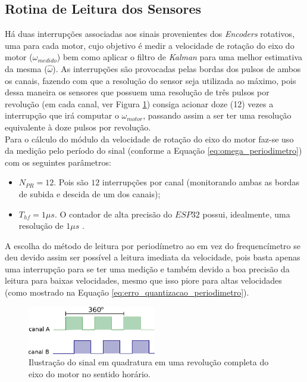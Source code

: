 \subsection{Rotina de Leitura dos Sensores}
\label{subsec:rotina_sensores}

Há duas interrupções associadas aos sinais provenientes dos \emph{Encoders} rotativos, uma para cada motor, cujo objetivo é medir a velocidade de rotação do eixo do motor ($\omega_{medido}$) bem como aplicar o filtro de \emph{Kalman} para uma melhor estimativa da mesma ($\hat{\omega}$). As interrupções são provocadas pelas bordas dos pulsos de ambos os canais, fazendo com que a resolução do sensor seja utilizada ao máximo, pois dessa maneira os sensores que possuem uma resolução de três pulsos por revolução (em cada canal, ver Figura \ref{fig:ilustracao_uma_revolucao}) consiga acionar doze (12) vezes a interrupção que irá computar o $\omega_{motor}$, passando assim a ser ter uma resolução equivalente à doze pulsos por revolução.\\

Para o cálculo do módulo da velocidade de rotação do eixo do motor faz-se uso da medição pelo período do sinal (conforme a Equação \ref{eq:omega_periodimetro}) com os seguintes parâmetros:

\begin{itemize}
    \item $N_{PR} = 12$. Pois são $12$ interrupções por canal (monitorando ambas as bordas de subida e descida de um dos canais);
    \item $T_{hf} = 1\mu{}s$. O contador de alta precisão do $ESP32$ possui, idealmente, uma resolução de $1\mu{}s$ \cite{esp}.
\end{itemize}

A escolha do método de leitura por periodímetro ao em vez do frequencímetro se deu devido assim ser possível a leitura imediata da velocidade, pois basta apenas uma interrupção para se ter uma medição e também devido a boa precisão da leitura para baixas velocidades, mesmo que isso piore para altas velocidades (como mostrado na Equação \ref{eq:erro_quantizacao_periodimetro}).

\begin{figure}[H]
    \centering
    \includegraphics[width=0.5\textwidth]{figuras/ilustracoes/sinal_enquadratura_uma_revolucao.eps}
    \caption{Ilustração do sinal em quadratura em uma revolução completa do eixo do motor no sentido horário.}
    \label{fig:ilustracao_uma_revolucao}
\end{figure}

